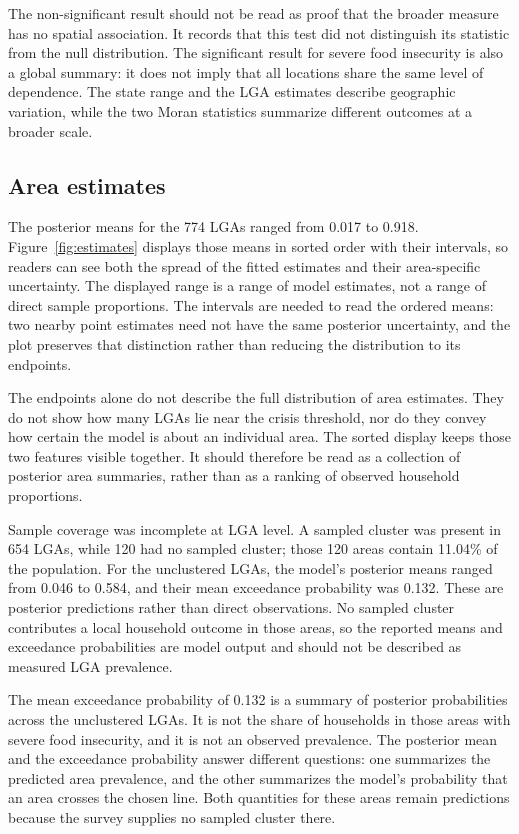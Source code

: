 The non-significant result should not be read as proof that the broader measure has no spatial association. It records that this test did not distinguish its statistic from the null distribution. The significant result for severe food insecurity is also a global summary: it does not imply that all locations share the same level of dependence. The state range and the LGA estimates describe geographic variation, while the two Moran statistics summarize different outcomes at a broader scale.

\subsection{Area estimates}

The posterior means for the 774 LGAs ranged from 0.017 to 0.918. Figure~\ref{fig:estimates} displays those means in sorted order with their intervals, so readers can see both the spread of the fitted estimates and their area-specific uncertainty. The displayed range is a range of model estimates, not a range of direct sample proportions. The intervals are needed to read the ordered means: two nearby point estimates need not have the same posterior uncertainty, and the plot preserves that distinction rather than reducing the distribution to its endpoints.

The endpoints alone do not describe the full distribution of area estimates. They do not show how many LGAs lie near the crisis threshold, nor do they convey how certain the model is about an individual area. The sorted display keeps those two features visible together. It should therefore be read as a collection of posterior area summaries, rather than as a ranking of observed household proportions.

Sample coverage was incomplete at LGA level. A sampled cluster was present in 654 LGAs, while 120 had no sampled cluster; those 120 areas contain 11.04\% of the population. For the unclustered LGAs, the model's posterior means ranged from 0.046 to 0.584, and their mean exceedance probability was 0.132. These are posterior predictions rather than direct observations. No sampled cluster contributes a local household outcome in those areas, so the reported means and exceedance probabilities are model output and should not be described as measured LGA prevalence.

The mean exceedance probability of 0.132 is a summary of posterior probabilities across the unclustered LGAs. It is not the share of households in those areas with severe food insecurity, and it is not an observed prevalence. The posterior mean and the exceedance probability answer different questions: one summarizes the predicted area prevalence, and the other summarizes the model's probability that an area crosses the chosen line. Both quantities for these areas remain predictions because the survey supplies no sampled cluster there.


